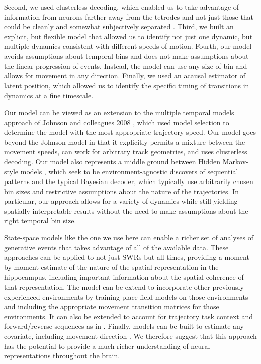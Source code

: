 \documentclass[times, twoside]{zHenriquesLab-StyleBioRxiv}
\begin{document}
Second, we used clusterless decoding, which enabled us to take advantage of information from neurons farther away from the tetrodes and not just those that could be cleanly and somewhat subjectively separated \cite{ChenBayesiannonparametricmethods2016, KloostermanBayesiandecodingusing2014, DengRapidclassificationhippocampal2016}. Third, we built an explicit, but flexible model that allowed us to identify not just one dynamic, but multiple dynamics consistent with different speeds of motion. Fourth, our model avoids assumptions about temporal bins and does not make assumptions about the linear progression of events. Instead, the model can use any size of bin and allows for movement in any direction. Finally, we used an acausal estimator of latent position, which allowed us to identify the specific timing of transitions in dynamics at a fine timescale.

Our model can be viewed as an extension to the multiple temporal models approach of Johnson and colleagues 2008 \cite{JohnsonMeasuringdistributedproperties2008}, which used model selection to determine the model with the most appropriate trajectory speed. Our model goes beyond the Johnson model in that it explicitly permits a mixture between the movement speeds, can work for arbitrary track geometries, and uses clusterless decoding. Our model also represents a middle ground between Hidden Markov-style models \cite{MaboudiUncoveringtemporalstructure2018, ChenBayesiannonparametricmethods2016, LindermanBayesiannonparametricapproach2016, ChenUncoveringspatialtopology2012}, which seek to be environment-agnostic discovers of sequential patterns and the typical Bayesian decoder, which typically use arbitrarily chosen bin sizes and  restrictive assumptions about the nature of the trajectories. In particular, our approach allows for a variety of dynamics while still yielding spatially interpretable results without the need to make assumptions about the right temporal bin size.

State-space models like the one we use here can enable a richer set of analyses of generative events that takes advantage of all of the available data. These approaches can be applied to not just SWRs but all times, providing a moment-by-moment estimate of the nature of the spatial representation in the hippocampus, including important information about the spatial coherence of that representation. The model can be extend to incorporate other previously experienced environments by training place field models on those environments and including the appropriate movement transition matrices for those environments. It can also be extended to account for trajectory task context and forward/reverse sequences as in \cite{DengRapidclassificationhippocampal2016}. Finally, models can be built to estimate any covariate, including movement direction \cite{KayConstantSubsecondCycling2020}. We therefore suggest that this approach has the potential to provide a much richer understanding of neural representations throughout the brain. 
\end{document}
